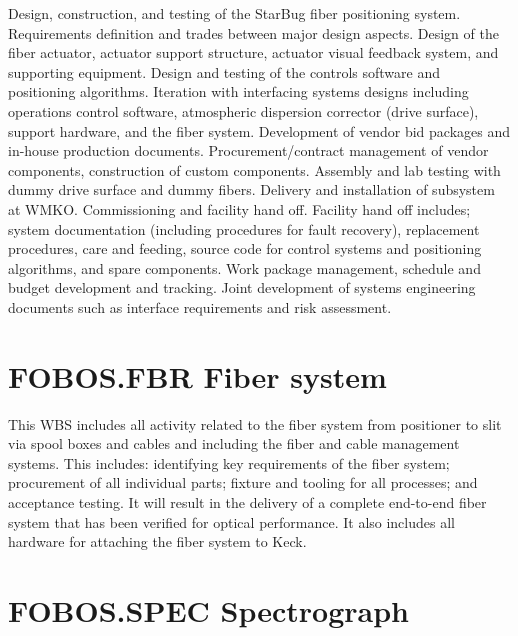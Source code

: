 \documentclass[oneside,11pt]{amsart}
\begin{document}
Design, construction, and testing of the StarBug fiber positioning
system. Requirements definition and trades between major design
aspects. Design of the fiber actuator, actuator support structure,
actuator visual feedback system, and supporting equipment. Design and
testing of the controls software and positioning algorithms.
Iteration with interfacing systems designs including operations
control software, atmospheric dispersion corrector (drive surface),
support hardware, and the fiber system. Development of vendor bid
packages and in-house production documents. Procurement/contract
management of vendor components, construction of custom components.
Assembly and lab testing with dummy drive surface and dummy
fibers. Delivery and installation of subsystem at WMKO.
Commissioning and facility hand off. Facility hand off includes;
system documentation (including procedures for fault recovery),
replacement procedures, care and feeding, source code for control
systems and positioning algorithms, and spare components. Work
package management, schedule and budget development and tracking.
Joint development of systems engineering documents such as interface
requirements and risk assessment.

\section{FOBOS.FBR Fiber system}

This WBS includes all activity related to the fiber system from
positioner to slit via spool boxes and cables and including the fiber
and cable management systems. This includes: identifying key
requirements of the fiber system; procurement of all individual
parts; fixture and tooling for all processes; and acceptance testing.
It will result in the delivery of a complete end-to-end fiber system
that has been verified for optical performance. It also includes all
hardware for attaching the fiber system to Keck.

\section{FOBOS.SPEC Spectrograph}
\end{document}

